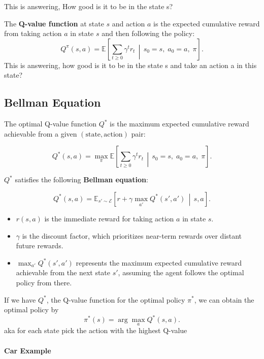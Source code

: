 \documentclass[11pt]{article}
\begin{document}
This is answering, How good is it to be in the state s?

\medskip

The \textbf{Q-value function} at state \(s\) and action \(a\) is the expected cumulative reward from taking action \(a\) in state \(s\) and then following the policy:
\[
Q^{\pi}(s, a) = 
\mathbb{E} \!\left[ \sum_{t \ge 0} \gamma^{t} r_t \,\middle|\, s_0 = s,\; a_0 = a,\; \pi \right].
\]
This is answering, how good is it to be in the state s and take an action a in this state?

\pagebreak

\subsection*{Bellman Equation}

The optimal Q-value function \(Q^{*}\) is the maximum expected cumulative reward
achievable from a given \((\text{state}, \text{action})\) pair:


\[
Q^{*}(s, a)
    = \max_{\pi} 
        \mathbb{E} \!\left[
            \sum_{t \ge 0} \gamma^{t} r_t \,\middle|\,
            s_0 = s,\; a_0 = a,\; \pi
        \right].
\]

\(Q^{*}\) satisfies the following \textbf{Bellman equation}:

\[
Q^{*}(s, a)
    = \mathbb{E}_{s' \sim \mathcal{E}} 
        \left[
            r + \gamma \max_{a'} Q^{*}(s', a')
            \,\middle|\, s, a
        \right].
\]

\begin{itemize}
    \item $r(s,a)$ is the immediate reward for taking action $a$ in state $s$.
    \item $\gamma$ is the discount factor, which prioritizes near-term rewards over distant future rewards.
    \item $\max_{a'} Q^{*}(s',a')$ represents the maximum expected cumulative reward achievable from the next state $s'$, assuming the agent follows the optimal policy from there.
\end{itemize}

If we have $Q^{*}$, the Q-value function for the optimal policy $\pi^{*}$, we can obtain the optimal policy by
\[
\pi^{*}(s) = \arg\max_{a} Q^{*}(s,a).
\]
aka for each state pick the action with the highest Q-value


\pagebreak

\paragraph*{Car Example}
\end{document}
